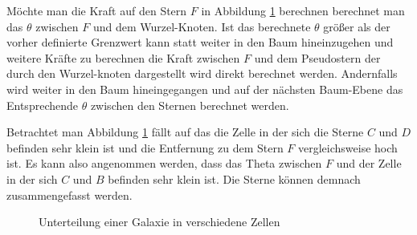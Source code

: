 \par Möchte man die Kraft auf den Stern \( F \) in Abbildung \ref{fig:cells}
berechnen berechnet man das \( \theta \) zwischen \( F \) und dem Wurzel-Knoten. Ist
das berechnete \( \theta \) größer als der vorher definierte Grenzwert kann statt
weiter in den Baum hineinzugehen und weitere Kräfte zu berechnen die Kraft
zwischen \( F \) und dem Pseudostern der durch den Wurzel-knoten dargestellt wird 
direkt berechnet werden. Andernfalls wird weiter in den Baum hineingegangen und
auf der nächsten Baum-Ebene das Entsprechende \( \theta \) zwischen den Sternen
berechnet werden.

\par Betrachtet man Abbildung \ref{fig:cells} fällt auf das die Zelle in der
sich die Sterne \( C \) und \( D \) befinden sehr klein ist und die Entfernung
zu dem Stern \( F \) vergleichsweise hoch ist. Es kann also angenommen werden,
dass das Theta zwischen \( F \) und der Zelle in der sich \( C \) und \( B \)
befinden sehr klein ist. Die Sterne können demnach zusammengefasst werden.

\bigskip

\begin{figure} 
\hspace{1.5cm}
\begin{minipage}{0.45\textwidth}
\end{minipage}
\caption{Unterteilung einer Galaxie in verschiedene Zellen}
\label{fig:cells}
\end{figure}

